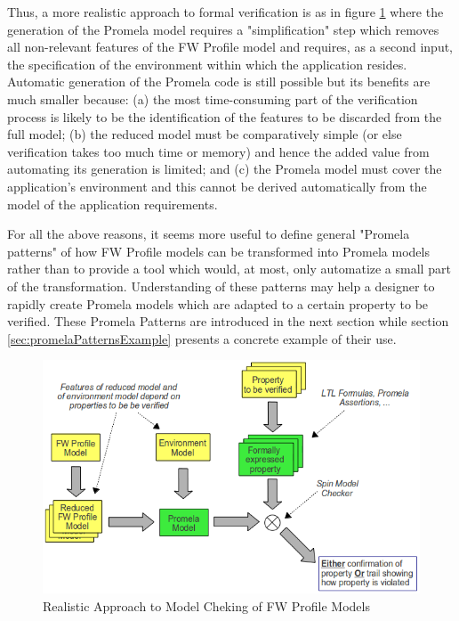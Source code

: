 \documentclass[a4paper,10pt]{article}
\begin{document}
Thus, a more realistic approach to formal verification is as in figure \ref{fig:FV_RealisticApproach} where the generation of the Promela model requires a "simplification" step which removes all non-relevant features of the FW Profile model and requires, as a second input, the specification of the environment within which the application resides. Automatic generation of the Promela code is still possible but its benefits are much smaller because: (a) the most time-consuming part of the verification process is likely to be the identification of the features to be discarded from the full model; (b) the reduced model must be comparatively simple (or else verification takes too much time or memory) and hence the added value from automating its generation is limited; and (c) the Promela model must cover the application's environment and this cannot be derived automatically from the model of the application requirements.

For all the above reasons, it seems more useful to define general "Promela patterns" of how FW Profile models can be transformed into Promela models rather than to provide a tool which would, at most, only automatize a small part of the transformation. Understanding of these patterns may help a designer to rapidly create Promela models which are adapted to a certain property to be verified. These Promela Patterns are introduced in the next section while section \ref{sec:promelaPatternsExample} presents a concrete example of their use. 

\begin{figure}[ht]
 \centering
 \includegraphics[scale=0.45,keepaspectratio=true]{../images/FV_RealisticApproach.png}
 \caption{Realistic Approach to Model Cheking of FW Profile Models}
 \label{fig:FV_RealisticApproach}
\end{figure}
\end{document}
